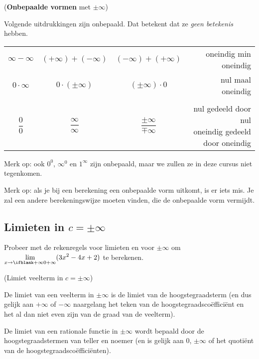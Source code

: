 \documentclass[numbers]{ximera}
\begin{document}
\begin{proposition} (\textbf{Onbepaalde vormen} met $\pm\infty$)
	
	Volgende uitdrukkingen zijn onbepaald. Dat betekent dat ze \textit{geen betekenis} hebben.	
	
	\begin{tabular}{cccr}
	$\infty - \infty$ &$(+\infty) + (-\infty)$  & 	$(-\infty) + (+\infty) $  & oneindig min oneindig \\
	$0\cdot\infty$ & $0 \cdot (\pm\infty)$   & 	$(\pm\infty)\cdot 0$   & nul maal oneindig \\
	\\
	$\dfrac 00$ & $\dfrac\infty\infty$ & $\dfrac{\pm\infty}{\mp\infty}$ & \shortstack{\hfill nul gedeeld door nul \\ oneindig gedeeld door oneindig}
	\end{tabular}
\end{proposition}
Merk op: ook $0^0$, $\infty^0$ en $1^\infty$ zijn onbepaald, maar we zullen ze in deze cursus niet tegenkomen.

Merk op: als je bij een berekening een onbepaalde vorm uitkomt, is er iets mis. Je zal een andere berekeningswijze moeten vinden, die de onbepaalde vorm vermijdt.

\subsection{Limieten in $c=\pm\infty$ }


\begin{exercise}
Probeer met de rekenregels voor limieten en voor $\pm\infty$ om $\limxi (3x^2-4x+2)$ te berekenen.


\end{exercise}

\begin{proposition} (Limiet veelterm in $c=\pm\infty$)

De limiet van een veelterm in $\pm\infty$ is de limiet van de hoogstegraadsterm (en dus gelijk aan $+\infty$ of $-\infty$ naargelang het teken van de hoogstegraadscoëfficiënt en het al dan niet even zijn van de graad van de veelterm).

De limiet van een rationale functie in $\pm\infty$ wordt bepaald door de hoogstegraadstermen van teller en noemer (en is gelijk aan $0$, $\pm\infty$ of het quotiënt van de hoogstegraadscoëfficiënten).
\end{proposition}
\end{document}
